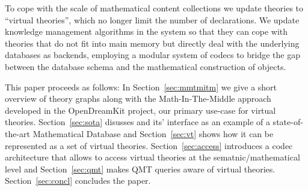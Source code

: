 To cope with the scale of mathematical content collections we update \ommt theories to ``virtual theories'', which no longer limit the number of declarations. 
We update knowledge management algorithms in the \mmt system so that they can cope with theories that do not fit into main memory but directly deal with the underlying databases as backends, employing a modular system of codecs to bridge the gap between the database schema and the mathematical construction of objects.

This paper proceeds as follows: 
In Section~\ref{sec:mmtmitm} we give a short overview of \ommt theory graphs along with the Math-In-The-Middle approach developed in the \textsf{OpenDreamKit} project, our primary use-case for virtual theories. 
Section~\ref{sec:sota} disusses \lmfdb and its' interface as an example of a state-of-the-art Mathematical Database and Section~\ref{sec:vt} shows how it can be represented as a set of virtual theories. 
Section~\ref{sec:access} introduces a codec architecture that allows to access virtual theories at the sematnic/mathematical level and Section~\ref{sec:qmt} makes QMT queries aware of virtual theories. 
Section~\ref{sec:concl} concludes the paper.


